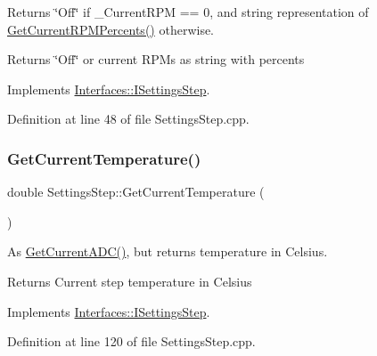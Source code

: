 Returns \char`\"{}\+Off\char`\"{} if \+\_\+\+Current\+R\+PM == 0, and string representation of \hyperlink{class_settings_step_a35bea9115637a0c848e8f827f2353c11}{Get\+Current\+R\+P\+M\+Percents()} otherwise. 

\begin{DoxyReturn}{Returns}
\char`\"{}\+Off\char`\"{} or current R\+P\+Ms as string with percents 
\end{DoxyReturn}


Implements \hyperlink{class_interfaces_1_1_i_settings_step_a7575d43b7d178d700e161ec48e2c766f}{Interfaces\+::\+I\+Settings\+Step}.



Definition at line 48 of file Settings\+Step.\+cpp.

\mbox{\label{class_settings_step_a78ec872aa61713e3df36e93f56804afe}} 
\subsubsection{\texorpdfstring{Get\+Current\+Temperature()}{GetCurrentTemperature()}}
{\footnotesize\ttfamily double Settings\+Step\+::\+Get\+Current\+Temperature (\begin{DoxyParamCaption}{ }\end{DoxyParamCaption})\hspace{0.3cm}{\ttfamily [virtual]}}



As \hyperlink{class_settings_step_a443f5643d9b547632c261c5f3a4288f1}{Get\+Current\+A\+D\+C()}, but returns temperature in Celsius. 

\begin{DoxyReturn}{Returns}
Current step temperature in Celsius 
\end{DoxyReturn}


Implements \hyperlink{class_interfaces_1_1_i_settings_step_a62644690b7b63d27e72eca277a32bfdd}{Interfaces\+::\+I\+Settings\+Step}.



Definition at line 120 of file Settings\+Step.\+cpp.

\mbox{\label{class_settings_step_a594ce71fb0626c79c3e4d4f988e484af}} 
